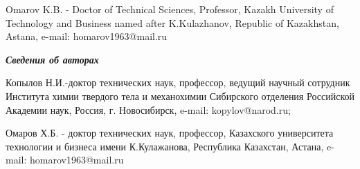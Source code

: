 Omarov K.B. - Doctor of Technical Sciences, Professor, Kazakh University
of Technology and Business named after K.Kulazhanov, Republic of
Kazakhstan, Astana, e-mail: homarov1963@mail.ru

\emph{{\bfseries Сведения об авторах}}

Копылов Н.И.-доктор технических наук, профессор, ведущий научный
сотрудник Института химии твердого тела и механохимии Сибирского
отделения Российской Академии наук, Россия, г. Новосибирск, e-mail:
kopylov@narod.ru;

Омаров Х.Б. - доктор технических наук, профессор, Казахского
университета технологии и бизнеса имени К.Кулажанова, Республика
Казахстан, Астана, e-mail: homarov1963@mail.ru